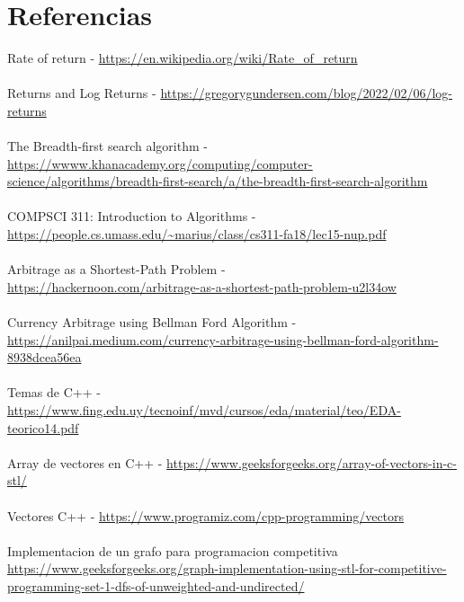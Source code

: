 \documentclass{article}
\begin{document}
\newpage
\section{Referencias}
Rate of return - \url{https://en.wikipedia.org/wiki/Rate_of_return}\\\\
Returns and Log Returns - \url{https://gregorygundersen.com/blog/2022/02/06/log-returns}\\\\
The Breadth-first search algorithm - \url{https://wwww.khanacademy.org/computing/computer-science/algorithms/breadth-first-search/a/the-breadth-first-search-algorithm}\\\\
COMPSCI 311: Introduction to Algorithms - \\\url{https://people.cs.umass.edu/~marius/class/cs311-fa18/lec15-nup.pdf}\\\\
Arbitrage as a Shortest-Path Problem - \\\url{https://hackernoon.com/arbitrage-as-a-shortest-path-problem-u2l34ow}\\\\
Currency Arbitrage using Bellman Ford Algorithm - \\\url{https://anilpai.medium.com/currency-arbitrage-using-bellman-ford-algorithm-8938dcea56ea}\\\\
Temas de C++ - \\\url{https://www.fing.edu.uy/tecnoinf/mvd/cursos/eda/material/teo/EDA-teorico14.pdf}\\\\
Array de vectores en C++ - \url{https://www.geeksforgeeks.org/array-of-vectors-in-c-stl/}\\\\
Vectores C++ - \url{https://www.programiz.com/cpp-programming/vectors}\\\\
Implementacion de un grafo para programacion competitiva \\ \url{https://www.geeksforgeeks.org/graph-implementation-using-stl-for-competitive-programming-set-1-dfs-of-unweighted-and-undirected/}
\end{document}
